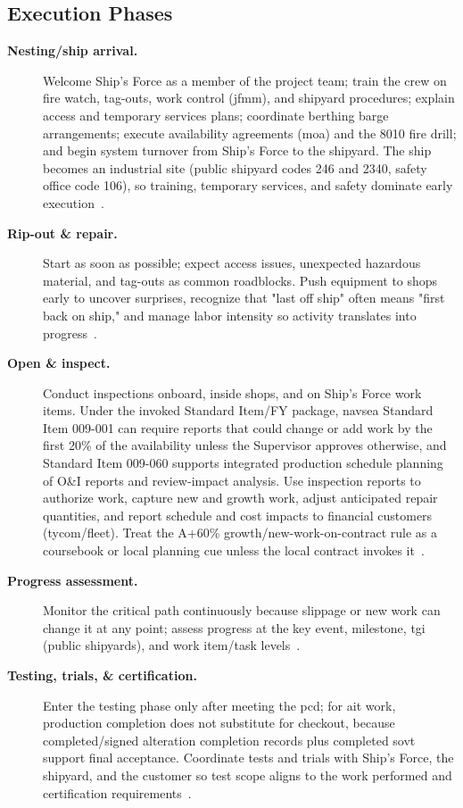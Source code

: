 \documentclass[../main.tex]{subfiles}
\begin{document}
\subsection{Execution Phases}
\begin{description}
  \item[\textbf{Nesting/ship arrival.}] Welcome Ship's Force as a member of the project team; train the crew on fire watch, tag-outs, work control (\ac{jfmm}), and shipyard procedures; explain access and temporary services plans; coordinate berthing barge arrangements; execute availability agreements (\ac{moa}) and the 8010 fire drill; and begin system turnover from Ship's Force to the shipyard. The ship becomes an industrial site (public shipyard codes 246 and 2340, safety office code 106), so training, temporary services, and safety dominate early execution~\autocite{edo-4-2-2-cno-availability-execution-2025,S0570-AC-CCM-010-8010}.
  \item[\textbf{Rip-out \& repair.}] Start as soon as possible; expect access issues, unexpected hazardous material, and tag-outs as common roadblocks. Push equipment to shops early to uncover surprises, recognize that "last off ship" often means "first back on ship," and manage labor intensity so activity translates into progress~\autocite{edo-4-2-2-cno-availability-execution-2025}.
  \item[\textbf{Open \& inspect.}] Conduct inspections onboard, inside shops, and on Ship's Force work items. Under the invoked Standard Item/FY package, \ac{navsea} Standard Item 009-001 can require reports that could change or add work by the first 20\% of the availability unless the Supervisor approves otherwise, and Standard Item 009-060 supports integrated production schedule planning of O\&I reports and review-impact analysis. Use inspection reports to authorize work, capture new and growth work, adjust anticipated repair quantities, and report schedule and cost impacts to financial customers (\ac{tycom}/fleet). Treat the A+60\% growth/new-work-on-contract rule as a coursebook or local planning cue unless the local contract invokes it~\autocite{NAVSEA-SSRAC-FY28,NAVSEA-STD-009-001-FY28,NAVSEA-STD-009-060-FY28,NAVSEA-STD-009-001-FY26,NAVSEA-STD-009-060-FY26,edo-4-2-2-cno-availability-execution-2025}.
  \item[\textbf{Progress assessment.}] Monitor the critical path continuously because slippage or new work can change it at any point; assess progress at the key event, milestone, \ac{tgi} (public shipyards), and work item/task levels~\autocite{edo-4-2-2-cno-availability-execution-2025}.
  \item[\textbf{Testing, trials, \& certification.}] Enter the testing phase only after meeting the \ac{pcd}; for \ac{ait} work, production completion does not substitute for checkout, because completed/signed alteration completion records plus completed \ac{sovt} support final acceptance. Coordinate tests and trials with Ship's Force, the shipyard, and the customer so test scope aligns to the work performed and certification requirements~\autocite{edo-4-2-2-cno-availability-execution-2025,TS9090-310}.
\end{description}
\end{document}
